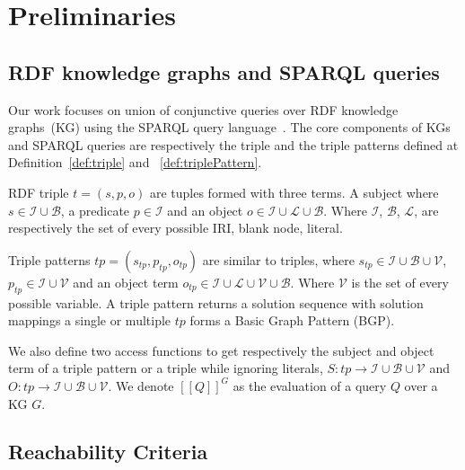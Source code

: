 \section{Preliminaries}\label{sec:preliminaries}

\subsection{RDF knowledge graphs and SPARQL queries}

Our work focuses on union of conjunctive queries over RDF knowledge graphs~(KG) using the SPARQL query language~\cite{w3SPARQLQuery}.
The core components of KGs and SPARQL queries are respectively the triple and the triple patterns defined at Definition~\ref{def:triple} and ~\ref{def:triplePattern}.

\begin{definition}[Triple]\label{def:triple}
    RDF triple $t = (s,p,o)$ are tuples formed with three terms. A subject where $s \in\mathcal{I} \cup \mathcal{B}$, a predicate $p \in \mathcal{I}$ and an object $o \in \mathcal{I} \cup \mathcal{L} \cup \mathcal{B}$.
    Where $\mathcal{I}$, $\mathcal{B}$, $\mathcal{L}$,  are respectively the set of every possible IRI, blank node, literal.
\end{definition}

\begin{definition}\label{def:triplePattern}
    Triple patterns $tp = (s_{tp}, p_{tp}, o_{tp})$ are similar to triples, where $s_{tp} \in \mathcal{I} \cup \mathcal{B} \cup \mathcal{V}$,
    $p_{tp} \in \mathcal{I} \cup \mathcal{V}$ and an object term  $o_{tp} \in \mathcal{I} \cup \mathcal{L} \cup \mathcal{V} \cup \mathcal{B}$.
    Where $\mathcal{V}$ is the set of every possible variable.
    A triple pattern returns a solution sequence with solution mappings a single or multiple $tp$ forms a Basic Graph Pattern (BGP).
\end{definition}

We also define two access functions to get respectively the subject and object term of a triple pattern or a triple while ignoring literals,
$ S: tp \rightarrow \mathcal{I} \cup \mathcal{B} \cup \mathcal{V}$ and $O: tp \rightarrow \mathcal{I} \cup \mathcal{B} \cup \mathcal{V}$.
We denote $[\![ Q ]\!]^{G}$ as the evaluation of a query $Q$ over a KG $G$.

\subsection{Reachability Criteria}

